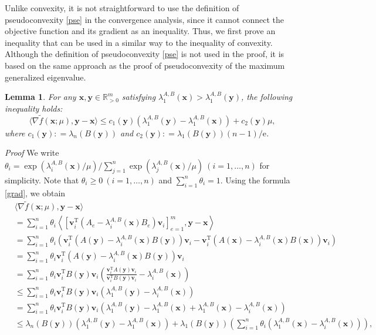 \documentclass[sn-mathphys,Numbered]{sn-jnl}%
\theoremstyle{thmstyleone}%
\theoremstyle{thmstyletwo}%
\theoremstyle{thmstylethree}%
\newtheorem{lemma}[theorem]{Lemma}
\newcommand{\e}[1]{\begin{equation}#1\end{equation}}
\newcommand{\prn}[1]{\left(#1\right)}
\def\coloneq{\mathrel{\mathop:}=}
\def\tp{\mathrm{T}}
\def\lamx{\lambda^{A,B}_1(\boldsymbol{x})}
\def\lamxi{\lambda^{A,B}_i(\boldsymbol{x})}
\def\lamxj{\lambda^{A,B}_j(\boldsymbol{x})}
\def\lamy{\lambda^{A,B}_1(\boldsymbol{y})}
\begin{document}
Unlike convexity, it is not straightforward to use the definition of pseudoconvexity \eqref{pse} in the convergence analysis, since it cannot connect the objective function and its gradient as an inequality. Thus, we first prove an inequality that can be used in a similar way to the inequality of convexity. Although the definition of pseudoconvexity \eqref{pse} is not used in the proof, it is based on the same approach as the proof of pseudoconvexity of the maximum generalized eigenvalue.

\begin{lemma}
For any $\bm{x},\bm{y}\in\mathbb{R}^m_{>0}$ satisfying $\lamx>\lamy$, the following inequality holds:
\e{
\langle\nabla\tilde{f}(\bm{x};\mu),\bm{y}-\bm{x}\rangle\le c_1(\bm{y})\prn{\lamy-\lamx}+c_2(\bm{y})\mu,
\label{q}
}
where $c_1(\bm{y}) \coloneq \lambda_n(B(\bm{y}))$ and $c_2(\bm{y}) \coloneq \lambda_1(B(\bm{y}))(n-1)/\mathrm{e}$.
\label{l_q}
\end{lemma}
{\it Proof }
We write $\theta_i=\exp(\lamxi/\mu)/\sum_{j=1}^n \exp(\lamxj/\mu)\ (i=1,\ldots,n)$ for simplicity. Note that $\theta_i\ge 0\ (i=1,\ldots,n)$ and $\sum_{i=1}^n\theta_i=1$. Using the formula \eqref{grad}, we obtain
\begin{align}
& \langle\nabla\tilde{f}(\bm{x};\mu),\bm{y}-\bm{x}\rangle\\
&= \sum_{i=1}^n \theta_i\left\langle\left[\bm{v}_i^\tp \left(A_e-\lamxi B_e\right)\bm{v}_i\right]_{e=1}^m,\bm{y}-\bm{x}\right\rangle\\
&= \sum_{i=1}^n \theta_i\prn{\bm{v}_i^\tp\prn{A(\bm{y})-\lamxi B(\bm{y})}\bm{v}_i-\bm{v}_i^\tp\prn{A(\bm{x})-\lamxi B(\bm{x})}\bm{v}_i}\\
&= \sum_{i=1}^n \theta_i\bm{v}_i^\tp \left(A(\bm{y})-\lamxi B(\bm{y})\right)\bm{v}_i\\
&= \sum_{i=1}^n \theta_i\bm{v}_i^\tp B(\bm{y})\bm{v}_i \left(\frac{\bm{v}_i^\tp A(\bm{y})\bm{v}_i}{\bm{v}_i^\tp B(\bm{y})\bm{v}_i}-\lamxi\right)\\
&\le \sum_{i=1}^n \theta_i\bm{v}_i^\tp B(\bm{y})\bm{v}_i \left(\lamy-\lamxi\right)\\
&= \sum_{i=1}^n \theta_i\bm{v}_i^\tp B(\bm{y})\bm{v}_i \left(\lamy-\lamx+\lamx-\lamxi\right)\\
&\le \lambda_n(B(\bm{y}))\left(\lamy-\lamx\right) + \lambda_1(B(\bm{y}))\left(\sum_{i=1}^n \theta_i\left(\lamx-\lamxi\right)\right),
\end{align}
\end{document}

